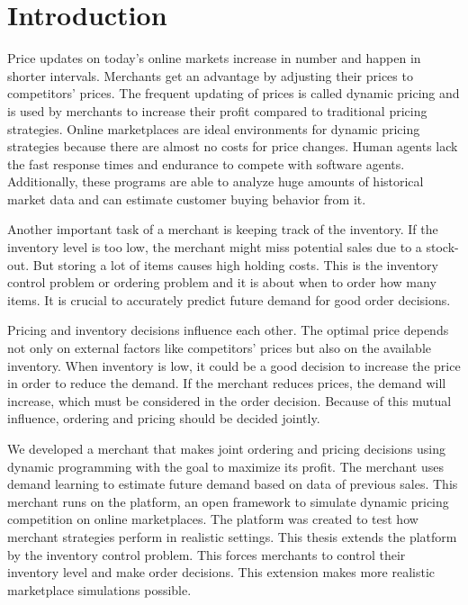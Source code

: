 
\chapter{Introduction}
Price updates on today's online markets increase in number and happen in shorter intervals.
Merchants get an advantage by adjusting their prices to competitors' prices.
The frequent updating of prices is called dynamic pricing and is used by merchants to increase their profit compared to traditional pricing strategies.
Online marketplaces are ideal environments for dynamic pricing strategies because there are almost no costs for price changes.
Human agents lack the fast response times and endurance to compete with software agents.
Additionally, these programs are able to analyze huge amounts of historical market data and can estimate customer buying behavior from it.

Another important task of a merchant is keeping track of the inventory.
If the inventory level is too low, the merchant might miss potential sales due to a stock-out.
But storing a lot of items causes high holding costs.
This is the inventory control problem or ordering problem and it is about when to order how many items.
It is crucial to accurately predict future demand for good order decisions.

Pricing and inventory decisions influence each other.
The optimal price depends not only on external factors like competitors' prices but also on the available inventory.
When inventory is low, it could be a good decision to increase the price in order to reduce the demand.
If the merchant reduces prices, the demand will increase, which must be considered in the order decision.
Because of this mutual influence, ordering and pricing should be decided jointly.

We developed a merchant that makes joint ordering and pricing decisions using dynamic programming with the goal to maximize its profit.
The merchant uses demand learning to estimate future demand based on data of previous sales.
This merchant runs on the \pricewars platform, an open framework to simulate dynamic pricing competition on online marketplaces.
The platform was created to test how merchant strategies perform in realistic settings.
This thesis extends the platform by the inventory control problem.
This forces merchants to control their inventory level and make order decisions.
This extension makes more realistic marketplace simulations possible.



